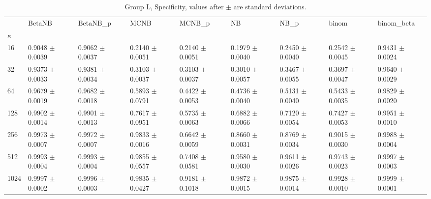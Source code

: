 \begin{table}[H]
\centering
\begin{adjustbox}{max width=\linewidth}
\begin{tabular}{lllllllll}
\toprule
 & BetaNB & BetaNB\_p & MCNB & MCNB\_p & NB & NB\_p & binom & binom\_beta \\
$\kappa$ &  &  &  &  &  &  &  &  \\
\midrule
16 & 0.9048 $\pm$ 0.0039 & 0.9062 $\pm$ 0.0037 & 0.2140 $\pm$ 0.0051 & 0.2140 $\pm$ 0.0051 & 0.1979 $\pm$ 0.0040 & 0.2450 $\pm$ 0.0040 & 0.2542 $\pm$ 0.0045 & 0.9431 $\pm$ 0.0024 \\
32 & 0.9373 $\pm$ 0.0033 & 0.9381 $\pm$ 0.0034 & 0.3103 $\pm$ 0.0037 & 0.3103 $\pm$ 0.0037 & 0.3010 $\pm$ 0.0057 & 0.3467 $\pm$ 0.0055 & 0.3697 $\pm$ 0.0047 & 0.9640 $\pm$ 0.0029 \\
64 & 0.9679 $\pm$ 0.0019 & 0.9682 $\pm$ 0.0018 & 0.5893 $\pm$ 0.0791 & 0.4422 $\pm$ 0.0053 & 0.4736 $\pm$ 0.0040 & 0.5131 $\pm$ 0.0040 & 0.5433 $\pm$ 0.0035 & 0.9829 $\pm$ 0.0020 \\
128 & 0.9902 $\pm$ 0.0014 & 0.9901 $\pm$ 0.0013 & 0.7617 $\pm$ 0.0951 & 0.5735 $\pm$ 0.0063 & 0.6882 $\pm$ 0.0066 & 0.7120 $\pm$ 0.0054 & 0.7427 $\pm$ 0.0053 & 0.9951 $\pm$ 0.0010 \\
256 & 0.9973 $\pm$ 0.0007 & 0.9972 $\pm$ 0.0007 & 0.9833 $\pm$ 0.0016 & 0.6642 $\pm$ 0.0059 & 0.8660 $\pm$ 0.0031 & 0.8769 $\pm$ 0.0034 & 0.9015 $\pm$ 0.0030 & 0.9988 $\pm$ 0.0004 \\
512 & 0.9993 $\pm$ 0.0004 & 0.9993 $\pm$ 0.0004 & 0.9855 $\pm$ 0.0557 & 0.7408 $\pm$ 0.0581 & 0.9580 $\pm$ 0.0030 & 0.9611 $\pm$ 0.0026 & 0.9743 $\pm$ 0.0023 & 0.9997 $\pm$ 0.0003 \\
1024 & 0.9997 $\pm$ 0.0002 & 0.9996 $\pm$ 0.0003 & 0.9835 $\pm$ 0.0427 & 0.9181 $\pm$ 0.1018 & 0.9872 $\pm$ 0.0015 & 0.9875 $\pm$ 0.0014 & 0.9928 $\pm$ 0.0010 & 0.9999 $\pm$ 0.0001 \\
\bottomrule
\end{tabular}

\end{adjustbox}
\caption{Group L, Specificity, values after $\pm$ are standard deviations.}
\end{table}
